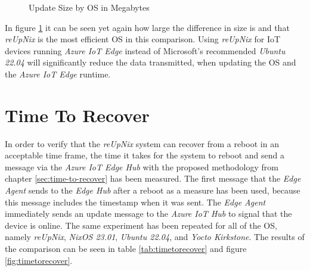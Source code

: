 \begin{figure}[htbp]
  \centering
\caption{Update Size by OS in Megabytes}
\label{fig:update-size}
\end{figure}

\noindent
In figure \ref{fig:update-size} it can be seen yet again how large the difference
in size is and that \textit{reUpNix} is the most efficient \ac{OS} in this comparison.
Using \textit{reUpNix} for \ac{IoT} devices running \textit{Azure IoT Edge}
instead of Microsoft's recommended \textit{Ubuntu 22.04} will significantly reduce
the data transmitted, when updating the \ac{OS} and the \textit{Azure IoT Edge} runtime.

\section{Time To Recover}
In order to verify that the \textit{reUpNix} system can recover from a reboot
in an acceptable time frame, the time it takes for the system to
reboot and send a message via the \textit{Azure IoT Edge Hub} with the proposed
methodology from chapter \ref{sec:time-to-recover} has been measured. The first message
that the \textit{Edge Agent} sends to the \textit{Edge Hub} after a reboot as
a measure has been used, because this message includes the timestamp when it was sent.
The \textit{Edge Agent} immediately sends an update message to the \textit{Azure
IoT Hub} to signal that the device is online. The same experiment has been repeated
for all of the \ac{OS}, namely \textit{reUpNix}, \textit{NixOS 23.01},
\textit{Ubuntu 22.04}, and \textit{Yocto Kirkstone}. The results of the comparison
can be seen in table \ref{tab:timetorecover} and figure \ref{fig:timetorecover}.


